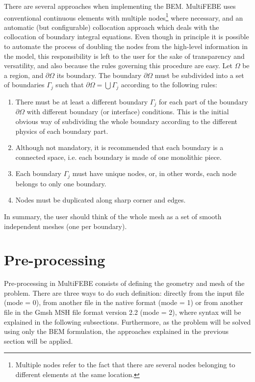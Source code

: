 \documentclass[A4]{article}
\begin{document}
There are several approaches when implementing the BEM. MultiFEBE uses conventional continuous elements with multiple nodes\footnote{Multiple nodes refer to the fact that there are several nodes belonging to different elements at the same location.} where necessary, and an automatic (but configurable) collocation approach which deals with the collocation of boundary integral equations. Even though in principle it is possible to automate the process of doubling the nodes from the high-level information in the model, this responsibility is left to the user for the sake of transparency and versatility, and also because the rules governing this procedure are easy. Let $\Omega$ be a region, and $\partial\Omega$ its boundary. The boundary $\partial\Omega$ must be subdivided into a set of boundaries $\Gamma_j$ such that $\partial\Omega=\bigcup\Gamma_j$ according to the following rules:

\begin{enumerate}
    \item There must be at least a different boundary $\Gamma_j$ for each part of the boundary $\partial\Omega$ with different boundary (or interface) conditions. This is the initial obvious way of subdividing the whole boundary according to the different physics of each boundary part.
    \item Although not mandatory, it is recommended that each boundary is a connected space, i.e. each boundary is made of one monolithic piece.
    \item Each boundary $\Gamma_j$ must have unique nodes, or, in other words, each node belongs to only one boundary.
    \item Nodes must be duplicated along sharp corner and edges. 
\end{enumerate}

In summary, the user should think of the whole mesh as a set of smooth independent meshes (one per boundary).

\section{Pre-processing} 

Pre-processing in MultiFEBE consists of defining the geometry and mesh of the problem. There are three ways to do such definition: directly from the input file (mode = 0), from another file in the native format (mode = 1) or from another file in the Gmsh MSH file format version 2.2 (mode = 2), where syntax will be explained in the following subsections. Furthermore, as the problem will be solved using only the BEM formulation, the approaches explained in the previous section will be applied.      
\end{document}

